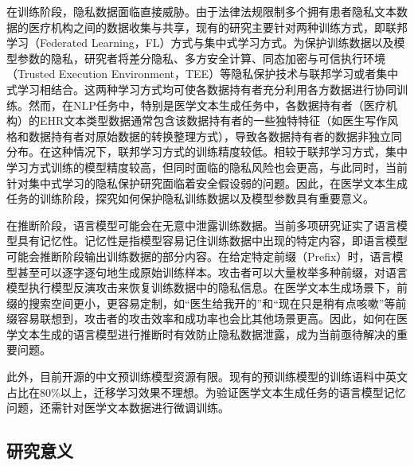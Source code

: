 在训练阶段，隐私数据面临直接威胁。由于法律法规限制多个拥有患者隐私文本数据的医疗机构之间的数据收集与共享，现有的研究主要针对两种训练方式，即联邦学习\cite{FL_ZS}（Federated Learning，FL）方式与集中式学习方式。为保护训练数据以及模型参数的隐私，研究者将差分隐私\cite{DP}、多方安全计算\cite{cramer2015secure}、同态加密\cite{acar2018survey}与可信执行环境\cite{sabt2015trusted}（Trusted Execution Environment，TEE）等隐私保护技术与联邦学习或者集中式学习相结合。这两种学习方式均可使各数据持有者充分利用各方数据进行协同训练。然而，在NLP任务中，特别是医学文本生成任务中，各数据持有者（医疗机构）的EHR文本类型数据通常包含该数据持有者的一些独特特征（如医生写作风格和数据持有者对原始数据的转换整理方式），导致各数据持有者的数据非独立同分布。在这种情况下，联邦学习方式的训练精度较低\cite{CC_FL, FL_Medical_Relation_Extraction, FL_CMF}。相较于联邦学习方式，集中学习方式训练的模型精度较高，但同时面临的隐私风险也会更高，与此同时，当前针对集中式学习的隐私保护研究面临着安全假设弱的问题。因此，在医学文本生成任务的训练阶段，探究如何保护隐私训练数据以及模型参数具有重要意义。

在推断阶段，语言模型可能会在无意中泄露训练数据。当前多项研究\cite{Extrac_Train_Data_From_LM, RealToxicityPrompts, Counterfactual, LMPPMean}证实了语言模型具有记忆性。记忆性是指模型容易记住训练数据中出现的特定内容，即语言模型可能会推断阶段输出训练数据的部分内容。在给定特定前缀（Prefix）时，语言模型甚至可以逐字逐句地生成原始训练样本。攻击者可以大量枚举多种前缀，对语言模型执行模型反演攻击来恢复训练数据中的隐私信息。在医学文本生成场景下，前缀的搜索空间更小，更容易定制，如“医生给我开的”和“现在只是稍有点咳嗽”等前缀容易联想到，攻击者的攻击效率和成功率也会比其他场景更高。因此，如何在医学文本生成的语言模型进行推断时有效防止隐私数据泄露，成为当前亟待解决的重要问题。



此外，目前开源的中文预训练模型资源有限。现有的预训练模型\cite{BERT, GPT2}的训练语料中英文占比在80\%以上，迁移学习效果不理想\cite{Transfer_Learning_4LM_Generation, Multi_NMT}。为验证医学文本生成任务的语言模型记忆问题，还需针对医学文本数据进行微调训练。

\subsection{研究意义}

